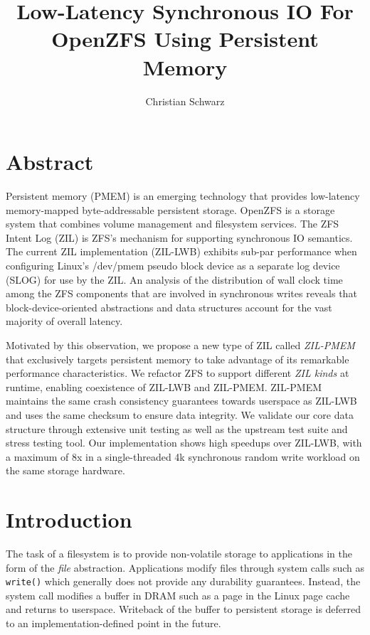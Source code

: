 \documentclass[12pt,a4paper,twoside]{book}
\begin{document}
\frontmatter
{}

\title{Low-Latency Synchronous IO For OpenZFS Using Persistent Memory}
\author{Christian Schwarz}
\maketitle



\chapter{Abstract}
Persistent memory (PMEM) is an emerging technology that provides low-latency memory-mapped byte-addressable persistent storage.
OpenZFS is a storage system that combines volume management and filesystem services.
The ZFS Intent Log (ZIL) is ZFS's mechanism for supporting synchronous IO semantics.
The current ZIL implementation (ZIL-LWB) exhibits sub-par performance when configuring Linux's \mbox{/dev/pmem} pseudo block device as a separate log device (SLOG) for use by the ZIL.
An analysis of the distribution of wall clock time among the ZFS components that are involved in synchronous writes reveals that block-device-oriented abstractions and data structures account for the vast majority of overall latency.

Motivated by this observation, we propose a new type of ZIL called \textit{ZIL-PMEM} that exclusively targets persistent memory to take advantage of its remarkable performance characteristics.
We refactor ZFS to support different \textit{ZIL kinds} at runtime, enabling coexistence of ZIL-LWB and ZIL-PMEM.
ZIL-PMEM maintains the same crash consistency guarantees towards userspace as ZIL-LWB and uses the same checksum to ensure data integrity.
We validate our core data structure through extensive unit testing as well as the upstream test suite and stress testing tool.
Our implementation shows high speedups over ZIL-LWB, with a maximum of 8x in a single-threaded 4k synchronous random write workload on the same storage hardware.

\mainmatter
\cleardoublepage
{}
{}
\tableofcontents

\listoftodos

\chapter{Introduction}
The task of a filesystem is to provide non-volatile storage to applications in the form of the \textit{file} abstraction.
Applications modify files through system calls such as \lstinline{write()} which generally does not provide any durability guarantees.
Instead, the system call modifies a buffer in DRAM such as a page in the Linux page cache and returns to userspace.
Writeback of the buffer to persistent storage is deferred to an implementation-defined point in the future.
\end{document}
